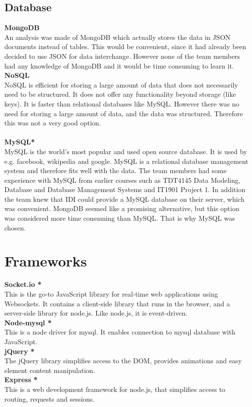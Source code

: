 \subsection{Database}
\textbf{MongoDB}\\
An analysis was made of MongoDB which actually stores the data in JSON documents instead of tables. This would be convenient, since it had already been decided to use JSON for data interchange. However none of the team members had any knowledge of MongoDB and it would be time consuming to learn it.
\\ \newline
\textbf{NoSQL}\\
NoSQL is efficient for storing a large amount of data that does not necessarily need to be structured. It does not offer any functionality beyond storage (like keys). It is faster than relational databases like MySQL. However there was no need for storing a large amount of data, and the data was structured. Therefore this was not a very good option.\\
\\ \newline
\textbf{MySQL*}\\
MySQL is the world’s most popular and used open source database. It is used by e.g. facebook, wikipedia and google. MySQL is a relational database management system and therefore fits well with the data. The team members had some experience with MySQL from earlier courses such as TDT4145 Data Modeling, Database and Database Management Systems and IT1901 Project 1. In addition the team knew that IDI could provide a MySQL database on their server, which was convenient. MongoDB seemed like a promising alternative, but this option was considered more time consuming than MySQL. That is why MySQL was chosen. 


\section{Frameworks}
\textbf{Socket.io *}\\
This is the go-to JavaScript library for real-time web applications using Websockets. It contains a client-side library that runs in the browser, and a server-side library for node.js. Like node.js, it is event-driven.
\\ \newline
\textbf{Node-mysql *}\\
This is a node driver for mysql. It enables connection to mysql database with JavaScript.
\\ \newline
\textbf{jQuery *}\\
The jQuery library simplifies access to the DOM, provides animations and easy element content manipulation.
\\ \newline
\textbf{Express *}\\
This is a web development framework for node.js, that simplifies access to routing, requests and sessions. 


